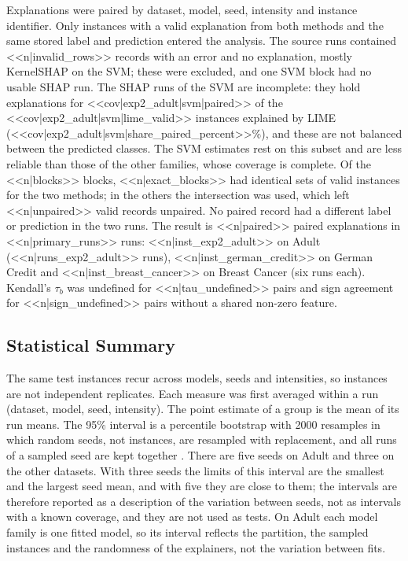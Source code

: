 Explanations were paired by dataset, model, seed, intensity and instance identifier.
Only instances with a valid explanation from both methods and the same stored label and
prediction entered the analysis. The source runs contained <<n|invalid_rows>> records
with an error and no explanation, mostly KernelSHAP on the SVM; these were excluded,
and one SVM block had no usable SHAP run. The SHAP runs of the SVM are incomplete: they
hold explanations for <<cov|exp2_adult|svm|paired>> of the
<<cov|exp2_adult|svm|lime_valid>> instances explained by LIME
(<<cov|exp2_adult|svm|share_paired_percent>>\%), and these are not balanced between the
predicted classes. The SVM estimates rest on this subset and are less reliable than those
of the other families, whose coverage is complete. Of the <<n|blocks>> blocks, <<n|exact_blocks>>
had identical sets of valid instances for the two methods; in the others the
intersection was used, which left <<n|unpaired>> valid records unpaired. No paired
record had a different label or prediction in the two runs. The result is <<n|paired>>
paired explanations in <<n|primary_runs>> runs: <<n|inst_exp2_adult>> on Adult
(<<n|runs_exp2_adult>> runs), <<n|inst_german_credit>> on German Credit and
<<n|inst_breast_cancer>> on Breast Cancer (six runs each). Kendall's $\tau_b$ was
undefined for <<n|tau_undefined>> pairs and sign agreement for <<n|sign_undefined>> pairs
without a shared non-zero feature.

\subsection{Statistical Summary}
\label{sec:methods:stats}

The same test instances recur across models, seeds and intensities, so instances are not
independent replicates. Each measure was first averaged within a run (dataset, model,
seed, intensity). The point estimate of a group is the mean of its run means. The 95\%
interval is a percentile bootstrap with 2000 resamples in which random seeds, not
instances, are resampled with replacement, and all runs of a sampled seed are kept
together \cite{efron1993introduction,cameron2015practitioner}. There are five seeds on
Adult and three on the other datasets. With three seeds the limits of this interval are
the smallest and the largest seed mean, and with five they are close to them; the
intervals are therefore reported as a description of the variation between seeds, not as
intervals with a known coverage, and they are not used as tests. On Adult each model
family is one fitted model, so its interval reflects the partition, the sampled instances
and the randomness of the explainers, not the variation between fits.

